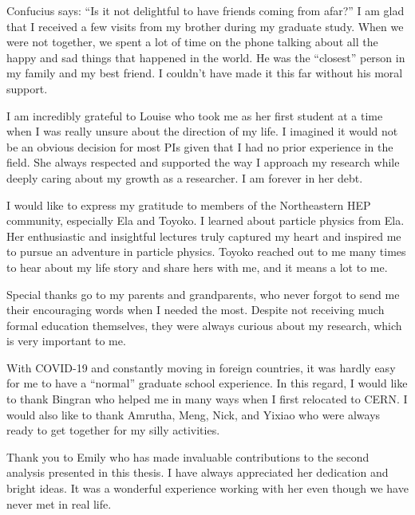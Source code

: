 \begin{acknowledgments}

Confucius says: ``Is it not delightful to have friends coming from afar?'' I am glad that I received a few visits from my brother during my graduate study. When we were not together, we spent a lot of time on the phone talking about all the happy and sad things that happened in the world. He was the ``closest'' person in my family and my best friend. I couldn’t have made it this far without his moral support.

I am incredibly grateful to Louise who took me as her first student at a time when I was really unsure about the direction of my life. I imagined it would not be an obvious decision for most PIs given that I had no prior experience in the field. She always respected and supported the way I approach my research while deeply caring about my growth as a researcher. I am forever in her debt.  

I would like to express my gratitude to members of the Northeastern HEP community, especially Ela and Toyoko. I learned about particle physics from Ela. Her enthusiastic and insightful lectures truly captured my heart and inspired me to pursue an adventure in particle physics. Toyoko reached out to me many times to hear about my life story and share hers with me, and it means a lot to me.

Special thanks go to my parents and grandparents, who never forgot to send me their encouraging words when I needed the most. Despite not receiving much formal education themselves, they were always curious about my research, which is very important to me.

With COVID-19 and constantly moving in foreign countries, it was hardly easy for me to have a ``normal'' graduate school experience. In this regard, I would like to thank Bingran who helped me in many ways when I first relocated to CERN. I would also like to thank Amrutha, Meng, Nick, and Yixiao who were always ready to get together for my silly activities. 

Thank you to Emily who has made invaluable contributions to the second analysis presented in this thesis. I have always appreciated her dedication and bright ideas. It was a wonderful experience working with her even though we have never met in real life.

\end{acknowledgments}